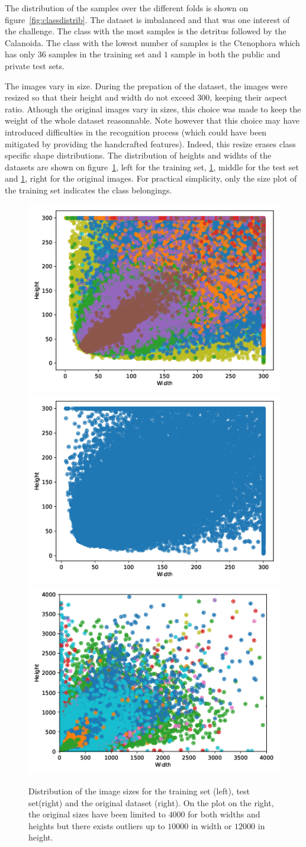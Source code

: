 \documentclass{article}
\begin{document}
The distribution of the samples over the different folds is shown on figure~\ref{fig:classdistrib}. The dataset is imbalanced and that was one interest of the challenge. The class with the most samples is the detritus followed by the Calanoida. The class with the lowest number of samples is the Ctenophora which has only $36$ samples in the training set and $1$ sample in both the public and private test sets.

The images vary in size. During the prepation of the dataset, the images were resized so that their height and width do not exceed $300$, keeping their aspect ratio. Athough the original images vary in sizes, this choice was made to keep the weight of the whole dataset reasonnable. Note however that this choice may have introduced difficulties in the recognition process (which could have been mitigated by providing the handcrafted features). Indeed, this resize erases class specific shape distributions. The distribution of heights and widhts of the datasets are shown on figure~\ref{fig:sizes}, left for the training set, \ref{fig:sizes}, middle for the test set and \ref{fig:sizes}, right for the original images. For practical simplicity, only the size plot of the training set indicates the class belongings.


\begin{figure}
	\begin{center}
		\includegraphics[width=0.3\columnwidth]{figs/size_train.png}
		\includegraphics[width=0.3\columnwidth]{figs/sizes_test.png}
		\includegraphics[width=0.3\columnwidth]{figs/size_orig.png}
	\end{center}
	\caption{\label{fig:sizes} Distribution of the image sizes for the training set (left), test set(right) and the original dataset (right). On the plot on the right, the original sizes have been limited to $4000$ for both widths and heights but there exists outliers up to $10000$ in width or $12000$ in height.}
\end{figure}
\end{document}
